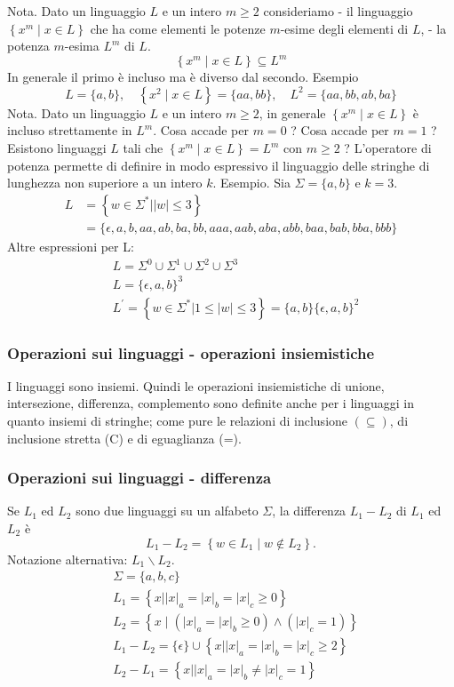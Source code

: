 Nota. Dato un linguaggio $L$ e un intero $m \geq 2$ consideriamo
- il linguaggio $\left\{x^{m} \mid x \in L\right\}$ che ha come elementi le potenze $m$-esime degli elementi di $L$,
- la potenza $m$-esima $L^{m}$ di $L$.
$$
\left\{x^{m} \mid x \in L\right\} \subseteq L^{m}
$$
In generale il primo è incluso ma è diverso dal secondo.
Esempio
$$
L=\{a, b\}, \quad\left\{x^{2} \mid x \in L\right\}=\{a a, b b\}, \quad L^{2}=\{a a, b b, a b, b a\}
$$
Nota. Dato un linguaggio $L$ e un intero $m \geq 2$, in generale $\left\{x^{m} \mid x \in L\right\}$ è incluso strettamente in $L^{m}$.
Cosa accade per $m=0$ ?
Cosa accade per $m=1$ ?
Esistono linguaggi $L$ tali che $\left\{x^{m} \mid x \in L\right\}=L^{m}$ con $m \geq 2$ ?
L'operatore di potenza permette di definire in modo espressivo il linguaggio delle stringhe di lunghezza non superiore a un intero $k$.
Esempio. Sia $\Sigma=\{a, b\}$ e $k=3$.
$$
\begin{aligned}
L &=\left\{w \in \Sigma^{*}|| w \mid \leq 3\right\} \\
&=\{\epsilon, a, b, a a, a b, b a, b b, a a a, a a b, a b a, a b b, b a a, b a b, b b a, b b b\}
\end{aligned}
$$
Altre espressioni per L:
$$
\begin{aligned}
&L=\Sigma^{0} \cup \Sigma^{1} \cup \Sigma^{2} \cup \Sigma^{3} \\
&L=\{\epsilon, a, b\}^{3} \\
&L^{\prime}=\left\{w \in \Sigma^{*}|1 \leq| w \mid \leq 3\right\}=\{a, b\}\{\epsilon, a, b\}^{2}
\end{aligned}
$$
\subsubsection{Operazioni sui linguaggi - operazioni insiemistiche}
I linguaggi sono insiemi. Quindi le operazioni insiemistiche di unione, intersezione, differenza, complemento sono definite anche per i linguaggi in quanto insiemi di stringhe;
come pure le relazioni di inclusione $(\subseteq)$, di inclusione stretta (C) e di eguaglianza (=).
\subsubsection{Operazioni sui linguaggi - differenza}
Se $L_{1}$ ed $L_{2}$ sono due linguaggi su un alfabeto $\Sigma$, la differenza $L_{1}-L_{2}$ di $L_{1}$ ed $L_{2}$ è
$$
L_{1}-L_{2}=\left\{w \in L_{1} \mid w \notin L_{2}\right\} .
$$
Notazione alternativa: $L_{1} \backslash L_{2}$.
$$
\begin{aligned}
&\Sigma=\{a, b, c\} \\
&L_{1}=\left\{\left.x|| x\right|_{a}=|x|_{b}=|x|_{c} \geq 0\right\} \\
&L_{2}=\left\{x \mid\left(|x|_{a}=|x|_{b} \geq 0\right) \wedge\left(|x|_{c}=1\right)\right\} \\
&L_{1}-L_{2}=\{\epsilon\} \cup\left\{\left.x|| x\right|_{a}=|x|_{b}=|x|_{c} \geq 2\right\} \\
&L_{2}-L_{1}=\left\{\left.x|| x\right|_{a}=|x|_{b} \neq|x|_{c}=1\right\}
\end{aligned}
$$
